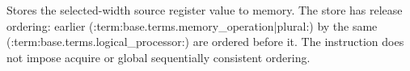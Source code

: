 Stores the selected-width source register value to memory. The store has release ordering: earlier
(:term:base.terms.memory_operation|plural:) by the same (:term:base.terms.logical_processor:) are ordered before it.
The instruction does not impose acquire or global sequentially consistent ordering.
